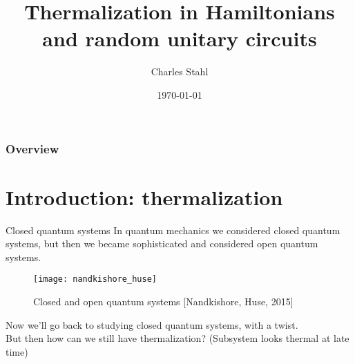 \documentclass{beamer}
\title[Thermalization]{Thermalization in Hamiltonians\\and random unitary circuits} %
\author{Charles Stahl} %
\date{\today} %
\begin{document}
\begin{frame}
\titlepage %
\end{frame}

\begin{frame}
\frametitle{Overview} %
\tableofcontents %
\end{frame}


\section{Introduction: thermalization}

\begin{frame}{Closed quantum systems}
In quantum mechanics we considered closed quantum systems, but then we became sophisticated and considered open quantum systems.
\begin{figure}
	\centering
	\texttt{[image: nandkishore\_huse]}
	\caption{Closed and open quantum systems [Nandkishore, Huse, 2015]}
\end{figure}
Now we'll go back to studying closed quantum systems, with a twist.\\
But then how can we still have thermalization? (Subsystem looks thermal at late time)
\end{frame}
\end{document}
